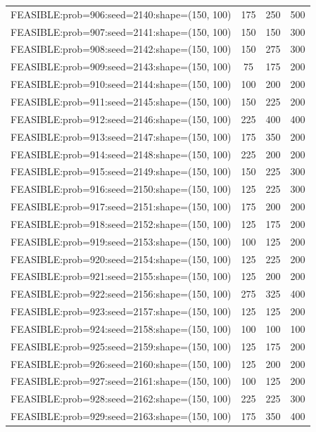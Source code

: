 \begin{longtable}{lccc}
FEASIBLE:prob=906:seed=2140:shape=(150, 100) &  175 &   250 &    500 \\
FEASIBLE:prob=907:seed=2141:shape=(150, 100) &  150 &   150 &    300 \\
FEASIBLE:prob=908:seed=2142:shape=(150, 100) &  150 &   275 &    300 \\
FEASIBLE:prob=909:seed=2143:shape=(150, 100) &   75 &   175 &    200 \\
FEASIBLE:prob=910:seed=2144:shape=(150, 100) &  100 &   200 &    200 \\
FEASIBLE:prob=911:seed=2145:shape=(150, 100) &  150 &   225 &    200 \\
FEASIBLE:prob=912:seed=2146:shape=(150, 100) &  225 &   400 &    400 \\
FEASIBLE:prob=913:seed=2147:shape=(150, 100) &  175 &   350 &    200 \\
FEASIBLE:prob=914:seed=2148:shape=(150, 100) &  225 &   200 &    200 \\
FEASIBLE:prob=915:seed=2149:shape=(150, 100) &  150 &   225 &    300 \\
FEASIBLE:prob=916:seed=2150:shape=(150, 100) &  125 &   225 &    300 \\
FEASIBLE:prob=917:seed=2151:shape=(150, 100) &  175 &   200 &    200 \\
FEASIBLE:prob=918:seed=2152:shape=(150, 100) &  125 &   175 &    200 \\
FEASIBLE:prob=919:seed=2153:shape=(150, 100) &  100 &   125 &    200 \\
FEASIBLE:prob=920:seed=2154:shape=(150, 100) &  125 &   225 &    200 \\
FEASIBLE:prob=921:seed=2155:shape=(150, 100) &  125 &   200 &    200 \\
FEASIBLE:prob=922:seed=2156:shape=(150, 100) &  275 &   325 &    400 \\
FEASIBLE:prob=923:seed=2157:shape=(150, 100) &  125 &   125 &    200 \\
FEASIBLE:prob=924:seed=2158:shape=(150, 100) &  100 &   100 &    100 \\
FEASIBLE:prob=925:seed=2159:shape=(150, 100) &  125 &   175 &    200 \\
FEASIBLE:prob=926:seed=2160:shape=(150, 100) &  125 &   200 &    200 \\
FEASIBLE:prob=927:seed=2161:shape=(150, 100) &  100 &   125 &    200 \\
FEASIBLE:prob=928:seed=2162:shape=(150, 100) &  225 &   225 &    300 \\
FEASIBLE:prob=929:seed=2163:shape=(150, 100) &  175 &   350 &    400 \\

\end{longtable}

